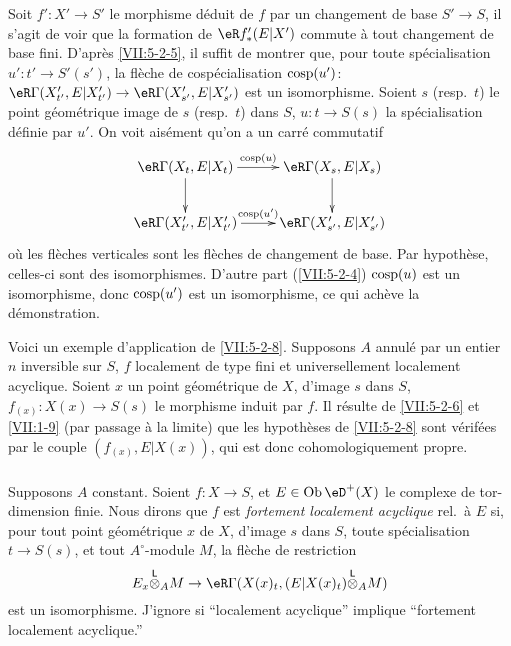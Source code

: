 Soit $f':X'\to S'$ le morphisme d\'eduit de $f$ par un changement de base 
$S'\to S$, il s'agit de voir que la formation de $\eR f_\ast'(E|X')$ commute 
\`a tout changement de base fini. D'apr\`es \ref{VII:5-2-5}, il suffit de 
montrer que, pour toute sp\'ecialisation $u':t'\to S'(s')$, la fl\`eche de 
cosp\'ecialisation $\operatorname{cosp}(u')$: 
$\eR\Gamma(X_{t'}',E|X_{t'}') \to \eR\Gamma(X_{s'}',E|X_{s'}')$ est un 
isomorphisme. Soient $s$ (resp.\ $t$) le point g\'eom\'etrique image de $s$ 
(resp.\ $t$) dans $S$, $u:t\to S(s)$ la sp\'ecialisation d\'efinie par $u'$. 
On voit ais\'ement qu'on a un carr\'e commutatif 
\[\xymatrix{
  \eR\Gamma(X_t,E|X_t) \ar[r]^-{\cosp(u)} \ar[d] 
    & \eR\Gamma(X_s,E|X_s) \ar[d] \\
  \eR\Gamma(X_{t'}',E|X_{t'}') \ar[r]^-{\cosp(u')} 
    & \eR\Gamma(X_{s'}',E|X_{s'}') 
}\]
o\`u les fl\`eches verticales sont les fl\`eches de changement de base. Par 
hypoth\`ese, celles-ci sont des isomorphismes. D'autre part (\ref{VII:5-2-4}) 
$\operatorname{cosp}(u)$ est un isomorphisme, donc $\operatorname{cosp}(u')$ est un isomorphisme, ce qui 
ach\`eve la d\'emonstration. 

Voici un exemple d'application de \ref{VII:5-2-8}. Supposons $A$ annul\'e par 
un entier $n$ inversible sur $S$, $f$ localement de type fini et 
universellement localement acyclique. Soient $x$ un point g\'eom\'etrique de 
$X$, d'image $s$ dans $S$, $f_{(x)}:X(x)\to S(s)$ le morphisme induit par $f$. 
Il r\'esulte de \ref{VII:5-2-6} et \ref{VII:1-9} (par passage \`a la limite) 
que les hypoth\`eses de \ref{VII:5-2-8} sont v\'erif\'ees par le couple 
$(f_{(x)},E|X(x))$, qui est donc cohomologiquement propre. 





\subsubsection{}\label{VII:5-2-9}

Supposons $A$ constant. Soient $f:X\to S$, et $E\in\ob\eD^+(X)$ le complexe de 
tor-dimension finie. Nous dirons que $f$ est \emph{fortement localement 
acyclique} rel.\ \`a $E$ si, pour tout point g\'eom\'etrique $x$ de $X$, 
d'image $s$ dans $S$, toute sp\'ecialisation $t\to S(s)$, et tout 
$A^\circ$-module $M$, la fl\`eche de restriction 
\[
  E_x\lotimes_A M \to \eR\Gamma(X(x)_t,(E|X(x)_t)\lotimes_A M) 
\]
est un isomorphisme. J'ignore si ``localement acyclique'' implique 
``fortement localement acyclique.'' 





